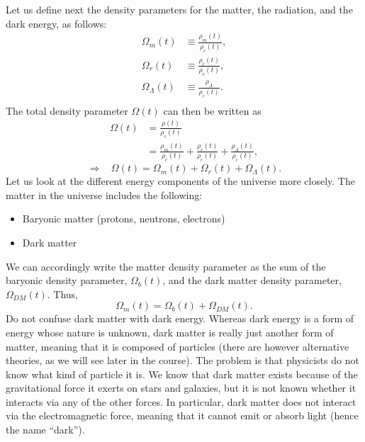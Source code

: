 Let us define next the density parameters for the matter, the radiation, and the dark energy, as follows:
\begin{equation}
\begin{split}
\Omega_m(t)&\equiv \frac{\rho_m(t)}{\rho_c(t)},\\
\Omega_r(t)&\equiv \frac{\rho_r(t)}{\rho_c(t)},\\
\Omega_{\Lambda}(t)&\equiv \frac{\rho_{\Lambda}}{\rho_c(t)}.\\
\end{split}
\end{equation}
The total density parameter $\Omega(t)$ can then be written as
\begin{equation}
\begin{split}
\Omega(t)&= \frac{\rho(t)}{\rho_c(t)}\\
&=\frac{\rho_m(t)}{\rho_c(t)}+\frac{\rho_r(t)}{\rho_c(t)}+\frac{\rho_{\Lambda}(t)}{\rho_c(t)},
\end{split}
\end{equation}
\begin{equation}
\Rightarrow~~~~\Omega(t)=\Omega_m(t)+\Omega_r(t)+\Omega_{\Lambda}(t).
\end{equation}
Let us look at the different energy components of the universe more closely. The matter in the universe includes the following:
\begin{itemize}
\item Baryonic matter (protons, neutrons, electrons)
\item Dark matter
\end{itemize}
We can accordingly write the matter density parameter as the sum of the baryonic density parameter, $\Omega_b(t)$, and the dark matter density parameter, $\Omega_{DM}(t)$. Thus,
\begin{equation}
\Omega_m(t)=\Omega_b(t)+\Omega_{DM}(t).
\end{equation}
Do not confuse dark matter with dark energy. Whereas dark energy is a form of energy whose nature is unknown, dark matter is really just another form of matter, meaning that it is composed of particles (there are however alternative theories, as we will see later in the course). The problem is that physicists do not know what kind of particle it is. We know that dark matter exists because of the gravitational force it exerts on stars and galaxies, but it is not known whether it interacts via any of the other forces. In particular, dark matter does not interact via the electromagnetic force, meaning that it cannot emit or absorb light (hence the name ``dark'').


